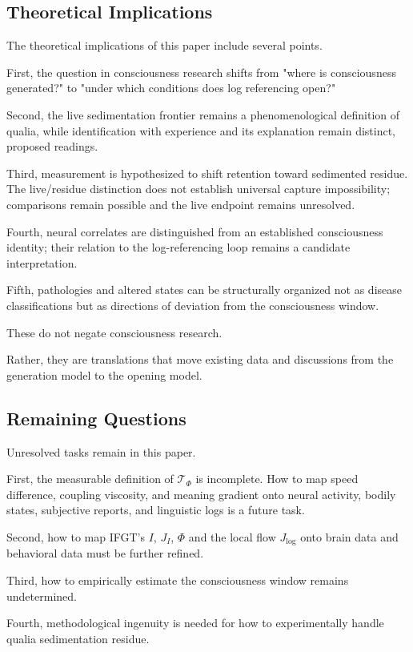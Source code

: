 \subsection{Theoretical Implications}


The theoretical implications of this paper include several points.

First, the question in consciousness research shifts from "where is consciousness generated?" to "under which conditions does log referencing open?"

Second, the live sedimentation frontier remains a phenomenological definition of qualia, while identification with experience and its explanation remain distinct, proposed readings.

Third, measurement is hypothesized to shift retention toward sedimented residue. The live/residue distinction does not establish universal capture impossibility; comparisons remain possible and the live endpoint remains unresolved.

Fourth, neural correlates are distinguished from an established consciousness identity; their relation to the log-referencing loop remains a candidate interpretation.

Fifth, pathologies and altered states can be structurally organized not as disease classifications but as directions of deviation from the consciousness window.

These do not negate consciousness research.

Rather, they are translations that move existing data and discussions from the generation model to the opening model.

\subsection{Remaining Questions}


Unresolved tasks remain in this paper.

First, the measurable definition of $\mathcal{T}_{\Phi}$ is incomplete. How to map speed difference, coupling viscosity, and meaning gradient onto neural activity, bodily states, subjective reports, and linguistic logs is a future task.

Second, how to map IFGT's $I$, $J_I$, $\Phi$ and the local flow $J_{\log}$ onto brain data and behavioral data must be further refined.

Third, how to empirically estimate the consciousness window remains undetermined.

Fourth, methodological ingenuity is needed for how to experimentally handle qualia sedimentation residue.

